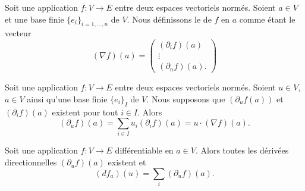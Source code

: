 \begin{definition}[gradient]		\label{DEFooWZGTooKCWBJn}
	Soit une application \(f \colon V\to E  \) entre deux espaces vectoriels normés. Soient \( a\in V\) et une base finie \( \{ e_i \}_{i=1,\ldots,n}\) de \( V\). Nous définissons le  de \( f\) en \( a\) comme étant le vecteur
	\begin{equation}
		(\nabla f)(a)=\begin{pmatrix}
			(\partial_if)(a) \\
			\vdots           \\
			(\partial_nf)(a).
		\end{pmatrix}
	\end{equation}
\end{definition}

\begin{proposition}		\label{PROPooYCLBooOLoDnM}
	Soit une application \(f \colon V\to E  \) entre deux espaces vectoriels normés. Soient \( u\in V\), \( a\in V\) ainsi qu'une base finie \( \{ e_i \}_I\) de \( V\). Nous supposons que \( (\partial_uf(a)) \) et \( (\partial_if)(a)\) existent pour tout \( i\in I\). Alors
	\begin{equation}
		(\partial_uf)(a)=\sum_{i\in I}u_i(\partial_if)(a)=u\cdot(\nabla f)(a).
	\end{equation}
\end{proposition}

\begin{proposition}			\label{PROPooZOFLooBmcZqN}
	Soit une application \(f \colon V\to E  \) différentiable en \( a\in V\). Alors toutes les dérivées directionnelles \( (\partial_uf)(a)\) existent et
	\begin{equation}
		(df_a)(u)=\sum_i(\partial_uf)(a).
	\end{equation}
\end{proposition}

